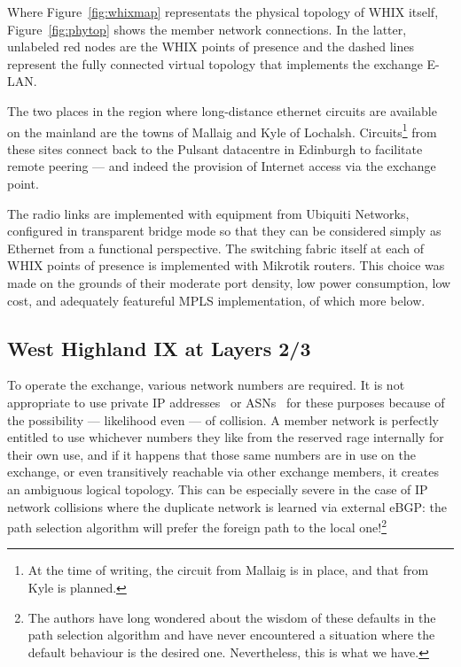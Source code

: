 Where Figure~\ref{fig:whixmap} representats the physical topology
of \ac{WHIX} itself, Figure~\ref{fig:phytop} shows the member network
connections. In the latter, unlabeled red nodes are the \ac{WHIX}
points of presence and the dashed lines represent the fully connected
virtual topology that implements the exchange E-LAN.

The two places in the region where long-distance ethernet circuits are
available on the mainland are the towns of Mallaig and Kyle of
Lochalsh. Circuits\footnote{At the time of writing, the circuit from
Mallaig is in place, and that from Kyle is planned.} from these sites
connect back to the Pulsant datacentre in Edinburgh to facilitate
remote peering --- and indeed the provision of Internet access via the
exchange point.

The radio links are implemented with equipment from Ubiquiti Networks,
configured in transparent bridge mode so that they can be considered
simply as Ethernet from a functional perspective. The switching fabric
itself at each of \ac{WHIX} points of presence is implemented with
Mikrotik routers. This choice was made on the grounds of their
moderate port density, low power consumption, low cost, and adequately
featureful \ac{MPLS} implementation, of which more below.

\subsection{West Highland IX at Layers 2/3}

To operate the exchange, various network numbers are required. It is
not appropriate to use private IP addresses~\cite{rfc1918}
or \acp{ASN}~\cite{rfc6996} for these purposes because of the
possibility --- likelihood even --- of collision. A member network is
perfectly entitled to use whichever numbers they like from the
reserved rage internally for their own use, and if it happens that
those same numbers are in use on the exchange, or even transitively
reachable via other exchange members, it creates an ambiguous logical
topology. This can be especially severe in the case of IP network
collisions where the duplicate network is learned via external eBGP:
the path selection algorithm will prefer the foreign path to the local
one!\footnote{The authors have long wondered about the wisdom of these
defaults in the path selection algorithm and have never encountered a
situation where the default behaviour is the desired
one. Nevertheless, this is what we have.}

